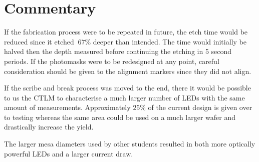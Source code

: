 \section{Commentary}
\label{sec:comment}

%

If the fabrication process were to be repeated in future, the etch time would be reduced since it etched $~67\%$ deeper than intended. The time would initially be halved then the depth measured before continuing the etching in 5 second periods. If the photomasks were to be redesigned at any point, careful consideration should be given to the alignment markers since they did not align.

If the scribe and break process was moved to the end, there it would be possible to us the CTLM to characterise a much larger number of LEDs with the same amount of measurements. Approximately $25\%$ of the current design is given over to testing whereas the same area could be used on a much larger wafer and drastically increase the yield.

The larger mesa diameters used by other students resulted in both more optically powerful LEDs and a larger current draw.
